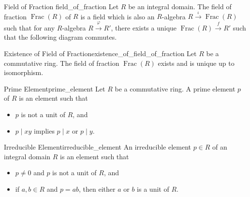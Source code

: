 \documentclass{article}
\begin{document}
\begin{definition}{Field of Fraction }{field_of_fraction}
    Let $R$ be an integral domain.
    The field of fraction $\operatorname{Frac}(R)$ of $R$ is a field which is also an $R$-algebra $R\xrightarrow{\iota} \operatorname{Frac}(R)$ such that for any $R$-algebra $R\xrightarrow{\varphi} R'$, there exists a unique $\operatorname{Frac}(R) \xrightarrow{f} R'$ such that the following diagram commutes.
    \begin{center}
    \end{center}
\end{definition}

\begin{proposition}{Existence of Field of Fraction}{existence_of_field_of_fraction}
    Let $R$ be a commutative ring.
    The field of fraction $\operatorname{Frac}(R)$ exists and is unique up to isomorphism.
\end{proposition}

\begin{definition}{Prime Element}{prime_element}
    Let $R$ be a commutative ring.
    A prime element $p$ of $R$ is an element such that
    \begin{itemize}
        \item $p$ is not a unit of $R$, and
        \item $p \mid xy$ implies $p \mid x$ or $p \mid y$.
    \end{itemize}
\end{definition}

\begin{definition}{Irreducible Element}{irreducible_element}
    An irreducible element $p\in R$ of an integral domain $R$ is an element such that
    \begin{itemize}
        \item $p\neq 0$ and $p$ is not a unit of $R$, and
        \item if $a,b\in R$ and $p=ab$, then either $a$ or $b$ is a unit of $R$.
    \end{itemize}
\end{definition}
\end{document}
